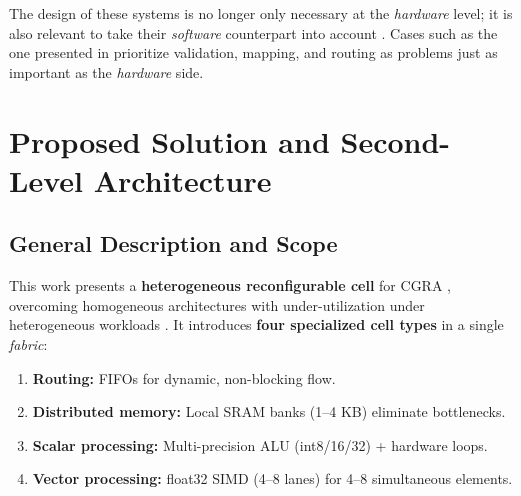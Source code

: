 \documentclass[conference]{IEEEtran}
\begin{document}
The design of these systems is no longer only necessary at the \textit{hardware} level; it is also relevant to take their \textit{software} counterpart into account \cite{plasticine2017}. Cases such as the one presented in \cite{dvhetero} prioritize validation, mapping, and routing as problems just as important as the \textit{hardware} side.



%
%
\section{Proposed Solution and Second-Level Architecture}

\subsection{General Description and Scope}
This work presents a \textbf{heterogeneous reconfigurable cell} for CGRA \cite{cgra_repo}, overcoming homogeneous architectures with under-utilization under heterogeneous workloads \cite{adres2004, hycube2017}. It introduces \textbf{four specialized cell types} in a single \textit{fabric}:
\begin{enumerate}
    \item \textbf{Routing:} FIFOs for dynamic, non-blocking flow.
    \item \textbf{Distributed memory:} Local SRAM banks (1–4 KB) eliminate bottlenecks.
    \item \textbf{Scalar processing:} Multi-precision ALU (int8/16/32) + hardware loops.
    \item \textbf{Vector processing:} float32 SIMD (4–8 lanes) for 4–8 simultaneous elements.
\end{enumerate}
\end{document}

